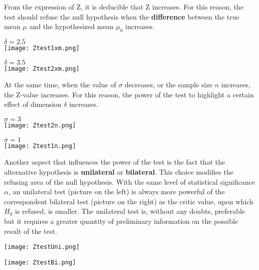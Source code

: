 \begin{frame}
  From the expression of Z, it is deducible that Z increases. For this reason, the test should refuse the null hypothesis when the \textbf{difference} between the true mean $\mu$ and the hypothesized mean $\mu_0$ increases.
  \vspace*{.3cm}
  \begin{floatingfigure}[l]{5cm}
    \centering
    $\delta=2.5$\\
    \texttt{[image: Ztest1xm.png]}\\
  \end{floatingfigure}
  \centering
  $\delta=3.5$\\
  \texttt{[image: Ztest2xm.png]}\\
\end{frame}


\begin{frame}
  At the same time, when the value of $\sigma$ decreases, or the sample size {\boldmath $ n $} increases, the Z-value increases. For this reason, the power of the test to highlight a certain effect of dimension $\delta$ increases.\\
  \begin{floatingfigure}[l]{5cm}
    \centering
    $\sigma=3$\\
    \texttt{[image: Ztest2n.png]}\\
  \end{floatingfigure}
  \centering
  $\sigma=1$\\
  \texttt{[image: Ztest1n.png]}\\
\end{frame}

\begin{frame}
  \begin{small}
    Another aspect that influences the power of the test is the fact that the alternative hypothesis is \textbf{unilateral} or \textbf{bilateral}. This choice modifies the refusing area of the null hypothesis. With the same level of statistical significance $\alpha$, an unilateral test (picture on the left) is always more powerful of the correspondent bilateral test (picture on the right) as the critic value, upon which $H_0$ is refused, is smaller. The unilateral test is, without any doubts, preferable but it requires a greater quantity of preliminary information on the possible result of the test.
  \end{small}
  \begin{floatingfigure}[l]{5cm}
    \centering
    \vspace*{-4.3cm}
    \texttt{[image: ZtestUni.png]}\\
  \end{floatingfigure}
  \vspace*{.3cm}
  \centering
  \texttt{[image: ZtestBi.png]}\\
\end{frame}

